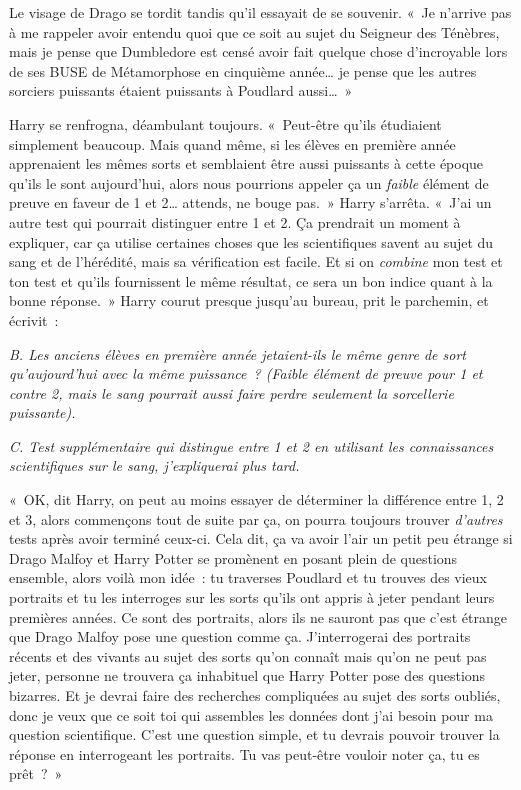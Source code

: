 Le visage de Drago se tordit tandis qu'il essayait de se souvenir. «~Je n'arrive pas à me rappeler avoir entendu quoi que ce soit au sujet du Seigneur des Ténèbres, mais je pense que Dumbledore est censé avoir fait quelque chose d'incroyable lors de ses BUSE de Métamorphose en cinquième année… je pense que les autres sorciers puissants étaient puissants à Poudlard aussi…~»

Harry se renfrogna, déambulant toujours. «~Peut-être qu'ils étudiaient simplement beaucoup. Mais quand même, si les élèves en première année apprenaient les mêmes sorts et semblaient être aussi puissants à cette époque qu'ils le sont aujourd'hui, alors nous pourrions appeler ça un \emph{faible} élément de preuve en faveur de 1 et 2… attends, ne bouge pas.~» Harry s'arrêta. «~J'ai un autre test qui pourrait distinguer entre 1 et 2. Ça prendrait un moment à expliquer, car ça utilise certaines choses que les scientifiques savent au sujet du sang et de l'hérédité, mais sa vérification est facile. Et si on \emph{combine} mon test et ton test et qu'ils fournissent le même résultat, ce sera un bon indice quant à la bonne réponse.~» Harry courut presque jusqu'au bureau, prit le parchemin, et écrivit~:

\emph{B. Les anciens élèves en première année jetaient-ils le même genre de sort qu'aujourd'hui avec la même puissance~? (Faible élément de preuve pour 1 et contre 2, mais le sang pourrait aussi faire perdre seulement la sorcellerie puissante).}

\emph{C. Test supplémentaire qui distingue entre 1 et 2 en utilisant les connaissances scientifiques sur le sang, j'expliquerai plus tard.}

«~OK, dit Harry, on peut au moins essayer de déterminer la différence entre 1, 2 et 3, alors commençons tout de suite par ça, on pourra toujours trouver \emph{d'autres} tests après avoir terminé ceux-ci. Cela dit, ça va avoir l'air un petit peu étrange si Drago Malfoy et Harry Potter se promènent en posant plein de questions ensemble, alors voilà mon idée~: tu traverses Poudlard et tu trouves des vieux portraits et tu les interroges sur les sorts qu'ils ont appris à jeter pendant leurs premières années. Ce sont des portraits, alors ils ne sauront pas que c'est étrange que Drago Malfoy pose une question comme ça. J'interrogerai des portraits récents et des vivants au sujet des sorts qu'on connaît mais qu'on ne peut pas jeter, personne ne trouvera ça inhabituel que Harry Potter pose des questions bizarres. Et je devrai faire des recherches compliquées au sujet des sorts oubliés, donc je veux que ce soit toi qui assembles les données dont j'ai besoin pour ma question scientifique. C'est une question simple, et tu devrais pouvoir trouver la réponse en interrogeant les portraits. Tu vas peut-être vouloir noter ça, tu es prêt~?~»

